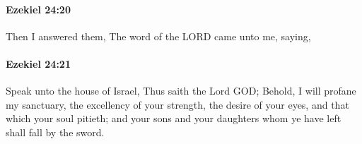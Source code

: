 		\paragraph{Ezekiel 24:20} %
			\label{EZEKIEL-24-20}

			Then I answered them, The word of the LORD came unto me, saying,


		\paragraph{Ezekiel 24:21} %
			\label{EZEKIEL-24-21}

			Speak unto the house of Israel, Thus saith the Lord GOD; Behold, I will profane my sanctuary, the excellency of your strength, the desire of your eyes, and that which your soul pitieth; and your sons and your daughters whom ye have left shall fall by the sword.


